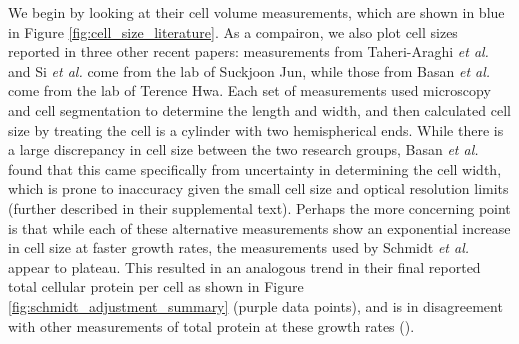 We begin by looking at their cell volume measurements, which are shown in blue in Figure \ref{fig:cell_size_literature}.
As a compairon, we also plot cell sizes reported in three other recent papers:
measurements from Taheri-Araghi \textit{et al.} and Si \textit{et al.} come from
the lab of Suckjoon Jun, while those from Basan \textit{et al.} come  from the lab
of Terence Hwa.  Each set of measurements used microscopy and cell segmentation to determine the
length and width, and then calculated cell size by treating the cell is a
cylinder with two hemispherical ends. While there is a large discrepancy in cell
size between the two research groups, Basan \textit{et al.} found that this came
specifically from uncertainty in determining the cell width, which is prone to
inaccuracy given the small cell size and optical resolution limits (further described in their supplemental text). Perhaps the
more concerning point is that while each of these alternative measurements show
an exponential increase in  cell size at faster growth rates, the
measurements used by Schmidt \textit{et al.} appear to plateau. This resulted in an analogous trend in their final reported total
cellular protein per cell as shown in Figure \ref{fig:schmidt_adjustment_summary} (purple data points),
 and is in disagreement with other measurements of total protein at these
 growth rates (\cite{basan2015}).

\begin{figure}
\end{figure}

